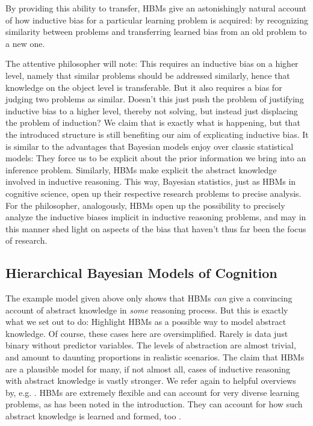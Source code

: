 \documentclass[11pt, a4paper]{article}
\begin{document}
By providing this ability to transfer, HBMs give an astonishingly natural
account of how inductive bias for a particular learning problem is acquired: by
recognizing similarity between problems and transferring learned bias from an
old problem to a new one.

The attentive philosopher will note: This requires an inductive bias on a higher
level, namely that similar problems should be addressed similarly, hence that
knowledge on the object level is transferable. But it also requires a bias for
judging two problems as similar. Doesn't this just push the problem of
justifying inductive bias to a higher level, thereby not solving, but instead
just displacing the problem of induction? We claim that is exactly what is
happening, but that the introduced structure is still benefiting our aim of
explicating inductive bias. It is similar to the advantages that Bayesian models
enjoy over classic statistical models: They force us to be explicit about the
prior information we bring into an inference problem. Similarly, HBMs make
explicit the abstract knowledge involved in inductive reasoning. This way,
Bayesian statistics, just as HBMs in cognitive science, open up their respective
research problems to precise analysis. For the philosopher, analogously, HBMs open up
the possibility to precisely analyze the inductive biases implicit in inductive
reasoning problems, and may in this manner shed light on aspects of the bias
that haven't thus far been the focus of research.

\subsection{Hierarchical Bayesian Models of Cognition}
\label{sec:org47c471a}

The example model given above only shows that HBMs \emph{can} give a convincing
account of abstract knowledge in \textit{some} reasoning process. But this is exactly what
we set out to do: Highlight HBMs as a possible way to model abstract knowledge.
Of course, these cases here are oversimplified. Rarely is data just binary
without predictor variables. The levels of abstraction are almost trivial, and
amount to daunting proportions in realistic scenarios. The claim
that HBMs are a plausible model for many, if not almost all, cases of inductive
reasoning with abstract knowledge is vastly stronger. We refer again to
helpful overviews by, e.g.
\citet{tenenbaum06_theor_based_bayes_model_induc_learn_reason,griffiths10_probab_model_cognit,tenenbaum11_how_to_grow_mind}.
HBMs are extremely flexible and can account for very diverse learning problems,
as has been noted in the introduction. They can account for how such abstract
knowledge is learned and formed, too \citep{kemp10_probab_model_theor_format}.
\end{document}
